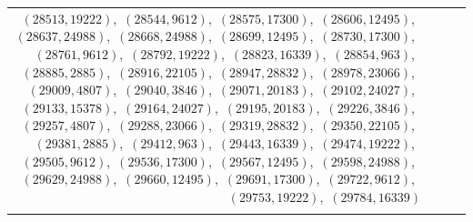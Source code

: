 \documentclass[11pt]{article}
\begin{document}
\begin{longtable}{@{}rrl>{\raggedright\arraybackslash}p{}@{}}
$(28513,19222)$,\allowbreak\ $(28544,9612)$,\allowbreak\ $(28575,17300)$,\allowbreak\ $(28606,12495)$,\allowbreak\ $(28637,24988)$,\allowbreak\ $(28668,24988)$,\allowbreak\ $(28699,12495)$,\allowbreak\ $(28730,17300)$,\allowbreak\ $(28761,9612)$,\allowbreak\ $(28792,19222)$,\allowbreak\ $(28823,16339)$,\allowbreak\ $(28854,963)$,\allowbreak\ $(28885,2885)$,\allowbreak\ $(28916,22105)$,\allowbreak\ $(28947,28832)$,\allowbreak\ $(28978,23066)$,\allowbreak\ $(29009,4807)$,\allowbreak\ $(29040,3846)$,\allowbreak\ $(29071,20183)$,\allowbreak\ $(29102,24027)$,\allowbreak\ $(29133,15378)$,\allowbreak\ $(29164,24027)$,\allowbreak\ $(29195,20183)$,\allowbreak\ $(29226,3846)$,\allowbreak\ $(29257,4807)$,\allowbreak\ $(29288,23066)$,\allowbreak\ $(29319,28832)$,\allowbreak\ $(29350,22105)$,\allowbreak\ $(29381,2885)$,\allowbreak\ $(29412,963)$,\allowbreak\ $(29443,16339)$,\allowbreak\ $(29474,19222)$,\allowbreak\ $(29505,9612)$,\allowbreak\ $(29536,17300)$,\allowbreak\ $(29567,12495)$,\allowbreak\ $(29598,24988)$,\allowbreak\ $(29629,24988)$,\allowbreak\ $(29660,12495)$,\allowbreak\ $(29691,17300)$,\allowbreak\ $(29722,9612)$,\allowbreak\ $(29753,19222)$,\allowbreak\ $(29784,16339)$\\
\addlinespace[3pt]
\end{longtable}
\endgroup
\end{document}
